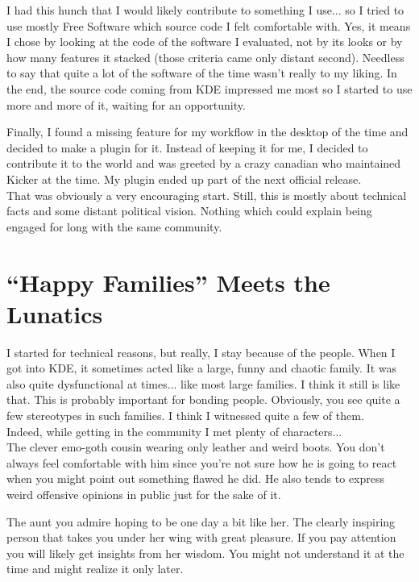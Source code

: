 I had this hunch that I would likely contribute to something I use... so I
tried to use mostly Free Software which source code I felt comfortable with.
Yes, it means I chose by looking at the code of the software I evaluated, not
by its looks or by how many features it stacked (those criteria came only
distant second). Needless to say that quite a lot of the software of the time
wasn't really to my liking. In the end, the source code coming from KDE
impressed me most so I started to use more and more of it, waiting for an
opportunity.

Finally, I found a missing feature for my workflow in the desktop of the time
and decided to make a plugin for it. Instead of keeping it for me, I decided to
contribute it to the world and was greeted by a crazy canadian who maintained
Kicker at the time. My plugin ended up part of the next official release. \\

That was obviously a very encouraging start. Still, this is mostly about
technical facts and some distant political vision. Nothing which could explain
being engaged for long with the same community.

\section*{``Happy Families'' Meets the Lunatics}
I started for technical reasons, but really, I stay because of the people.
When I got into KDE, it sometimes acted like a large, funny and chaotic family.
It was also quite dysfunctional at times... like most large families. I think it
still is like that. This is probably important for bonding people. Obviously,
you see quite a few stereotypes in such families. I think I witnessed quite a
few of them. \\

Indeed, while getting in the community I met plenty of characters... \\

The clever emo-goth cousin wearing only leather and weird boots. You don't
always feel comfortable with him since you're not sure how he is going to react
when you might point out something flawed he did. He also tends to express
weird offensive opinions in public just for the sake of it.

The aunt you admire hoping to be one day a bit like her. The clearly inspiring
person that takes you under her wing with great pleasure. If you pay attention
you will likely get insights from her wisdom. You might not understand it at
the time and might realize it only later.

